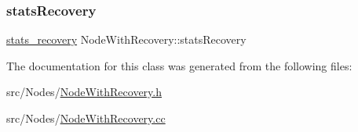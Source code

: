 \mbox{\label{class_node_with_recovery_abaecd0d1b36ad0305c281905a3465dd6}} 
\subsubsection{\texorpdfstring{stats\+Recovery}{statsRecovery}}
{\footnotesize\ttfamily \hyperlink{_node_with_recovery_8h_a8724f9aa35500c4029d1757428ade746}{stats\+\_\+recovery} Node\+With\+Recovery\+::stats\+Recovery\hspace{0.3cm}{\ttfamily [protected]}}



The documentation for this class was generated from the following files\+:\begin{DoxyCompactItemize}
\item 
src/\+Nodes/\hyperlink{_node_with_recovery_8h}{Node\+With\+Recovery.\+h}\item 
src/\+Nodes/\hyperlink{_node_with_recovery_8cc}{Node\+With\+Recovery.\+cc}\end{DoxyCompactItemize}
